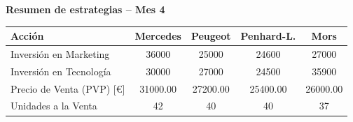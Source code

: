 \documentclass{standalone}
\begin{document}
	\leavevmode
	
	\begin{minipage}{1.02\linewidth}
		\centering
		
		\textbf{Resumen de estrategias – Mes 4}\\[0.5em]
		\begin{tabular}{@{}l
				S[table-format=5.0]
				S[table-format=5.0]
				S[table-format=5.0]
				S[table-format=5.0]@{}}
			\toprule
			\textbf{Acción} & \textbf{Mercedes} & \textbf{Peugeot} & \textbf{Penhard-L.} & \textbf{Mors} \\
			\midrule
			Inversión en Marketing              & 36000  & 25000  & 24600  & 27000 \\
			Inversión en Tecnología             & 30000  & 27000  & 24500  & 35900 \\
			Precio de Venta (PVP) [\euro]       & 31000.00 & 27200.00 & 25400.00 & 26000.00 \\
			Unidades a la Venta                 & 42     & 40     & 40     & 37 \\
			\bottomrule
		\end{tabular}
	\end{minipage}
	
\end{document}
